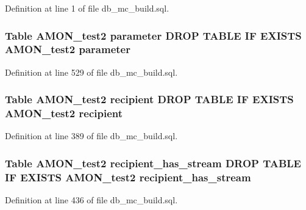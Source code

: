 Definition at line 1 of file db\-\_\-mc\-\_\-build.\-sql.

\hypertarget{db__mc__build_8sql_ae160d9514a53a2b7c888f4b9e50004f3}{
\subsubsection[{parameter}]{\setlength{\rightskip}{0pt plus 5cm}Table {\bf A\-M\-O\-N\-\_\-test2} parameter D\-R\-O\-P T\-A\-B\-L\-E I\-F E\-X\-I\-S\-T\-S {\bf A\-M\-O\-N\-\_\-test2} parameter}}\label{db__mc__build_8sql_ae160d9514a53a2b7c888f4b9e50004f3}


Definition at line 529 of file db\-\_\-mc\-\_\-build.\-sql.

\hypertarget{db__mc__build_8sql_ab1bb798436f3119e40c17076157bac00}{
\subsubsection[{recipient}]{\setlength{\rightskip}{0pt plus 5cm}Table {\bf A\-M\-O\-N\-\_\-test2} recipient D\-R\-O\-P T\-A\-B\-L\-E I\-F E\-X\-I\-S\-T\-S {\bf A\-M\-O\-N\-\_\-test2} recipient}}\label{db__mc__build_8sql_ab1bb798436f3119e40c17076157bac00}


Definition at line 389 of file db\-\_\-mc\-\_\-build.\-sql.

\hypertarget{db__mc__build_8sql_ac0780f1034c332e43fb4ac08abb5f78e}{
\subsubsection[{recipient\-\_\-has\-\_\-stream}]{\setlength{\rightskip}{0pt plus 5cm}Table {\bf A\-M\-O\-N\-\_\-test2} recipient\-\_\-has\-\_\-stream D\-R\-O\-P T\-A\-B\-L\-E I\-F E\-X\-I\-S\-T\-S {\bf A\-M\-O\-N\-\_\-test2} recipient\-\_\-has\-\_\-stream}}\label{db__mc__build_8sql_ac0780f1034c332e43fb4ac08abb5f78e}


Definition at line 436 of file db\-\_\-mc\-\_\-build.\-sql.

